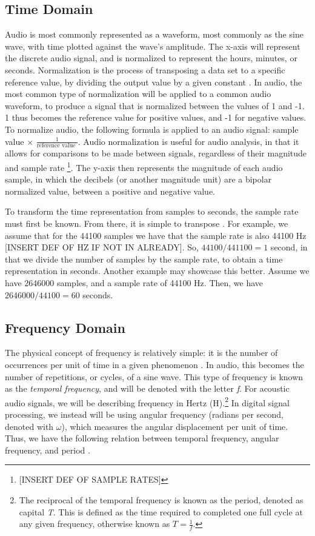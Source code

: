 \subsection{Time Domain}

Audio is most commonly represented as a waveform, most commonly as the sine wave, with time plotted against the wave's amplitude. The x-axis will represent the discrete audio signal, and is normalized to represent the hours, minutes, or seconds. Normalization is the process of transposing a data set to a specific reference value, by dividing the output value by a given constant \cite{Zjalic_2021}. In audio, the most common type of normalization will be applied to a common audio waveform, to produce a signal that is normalized between the values of 1 and -1. 1 thus becomes the reference value for positive values, and -1 for negative values. To normalize audio, the following formula is applied to an audio signal: sample value $\times$ $\frac{1}{\textrm{reference value }}$. Audio normalization is useful for audio analysis, in that it allows for comparisons to be made between signals, regardless of their magnitude and sample rate \footnote{[INSERT DEF OF SAMPLE RATES]}. The y-axis then represents the magnitude of each audio sample, in which the decibels (or another magnitude unit) are a bipolar normalized value, between a positive and negative value. 

To transform the time representation from samples to seconds, the sample rate must first be known. From there, it is simple to transpose \cite{Zjalic_2021}. For example, we assume that for the 44100 samples we have that the sample rate is also 44100 Hz [INSERT DEF OF HZ IF NOT IN ALREADY]. So, $44100 / 441100 = 1$ second, in that we divide the number of samples by the sample rate, to obtain a time representation in seconds. Another example may showcase this better. Assume we have 2646000 samples, and a sample rate of 44100 Hz. Then, we have $2646000/44100 = 60$ seconds.

\subsection{Frequency Domain}
The physical concept of frequency is relatively simple: it is the number of occurrences per unit of time in a given phenomenon \cite{Gabrielli_2020}. In audio, this becomes the number of repetitions, or cycles, of a sine wave. This type of frequency is known as the \textit{temporal frequency}, and will be denoted with the letter \textit{f}. For acoustic audio signals, we will be describing frequency in Hertz (H).\footnote{The reciprocal of the temporal frequency is known as the period, denoted as capital \textit{T}. This is defined as the time required to completed one full cycle at any given frequency, otherwise known as $T = \frac{1}{\textit{f}}$.} In digital signal processing, we instead will be using angular frequency (radians per second, denoted with $\omega$), which measures the angular displacement per unit of time. Thus, we have the following relation between temporal frequency, angular frequency, and period \cite{Gabrielli_2020}.

